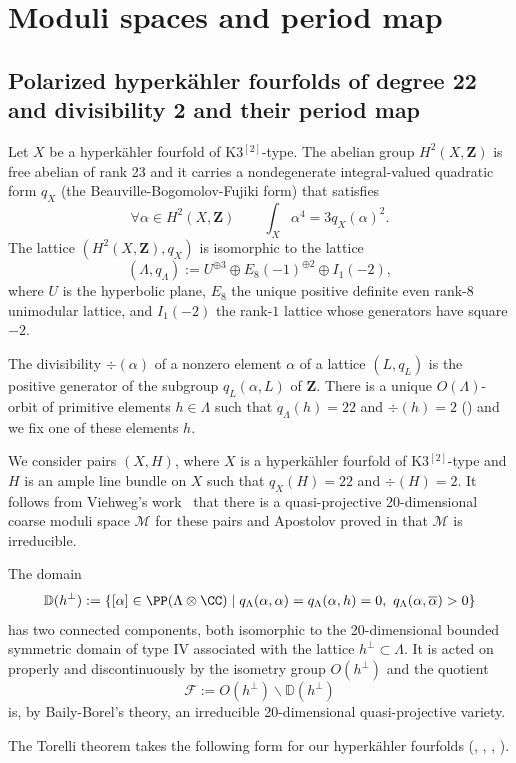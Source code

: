 \documentclass[JEP,XML,SOM,Unicode, NoEqCountersInSection,NoFloatCountersInSection]{cedram}
\let\mathcal\mathscr
\theoremstyle{definition}
\newcommand\Z{{\mathbf Z}}
\newcommand\mD{\mathbb{D}}
\newcommand\cF{\mathcal{F}}
\newcommand\cM{\mathcal{M}}
\newcommand\hk{hyperkähler\xspace}
\begin{document}
\section{Moduli spaces and period map}

\subsection{Polarized \hk fourfolds of degree 22 and divisibility 2 and their period map}\label{sec21}

Let $X$ be a \hk fourfold of K3$^{[2]}$-type. The abelian group $H^2(X,\Z)$ is free abelian of rank 23 and it carries a nondegenerate integral-valued quadratic form $q_X$ (the Beauville-Bogomolov-Fujiki form) that satisfies
\[
\forall \alpha\in H^2(X,\Z)\qquad \int_X\alpha^4=3q_X(\alpha)^2
.
\]
The lattice $(H^2(X,\Z),q_X)$ is isomorphic to the lattice
\[
(\Lambda,q_\Lambda):=U^{\oplus 3}\oplus E_8(-1)^{\oplus 2}\oplus I_1(-2),
\]
where $U$ is the hyperbolic plane, $E_8$ the unique positive definite even rank-$8$ unimodular lattice, and $I_1(-2) $ the rank-$1$ lattice whose generators have square $-2$.

The divisibility $\div(\alpha)$ of a nonzero element $\alpha$ of a lattice $( L,q_L)$ is the positive generator of the subgroup $q_L(\alpha, L)$ of $ \Z$. There is a unique $O(\Lambda)$-orbit of primitive elements $h\in \Lambda$ such that $q_\Lambda(h)=22$ and $\div(h)=2$ (\cite[Cor.\,3.7 \& Ex.\,3.10]{ghscomp}) and we fix one of these elements $h$.

We consider pairs $(X,H)$, where $X$ is a \hk fourfold of K3$^{[2]}$-type and $H$ is an ample line bundle on $X$ such that $q_X(H)=22$ and $\div(H)=2$. It follows from Viehweg's work~\cite{vie} that there is a quasi-projective 20-dimensional coarse moduli space $\cM$ for these pairs and Apostolov proved in \cite{apo} that $\cM$ is irreducible.

The domain
\[
\mD(h^\bot):=\{[\alpha]\in\PP(\Lambda\otimes\CC) \mid q_\Lambda(\alpha, \alpha) =q_\Lambda(\alpha, h) =0,\ q_\Lambda(\alpha,\overline \alpha) >0\}
\]
has two connected components, both isomorphic to the 20-dimensional bounded symmetric domain of type IV associated with the lattice $h^\bot\subset \Lambda$.
It is acted on properly and discontinuously by the {isometry group} $ O(h^\bot)$
and the quotient
\[
\cF:= O(h^\bot)\backslash \mD(h^\bot)
\]
is, by Baily-Borel's theory, an irreducible 20-dimensional quasi-projective variety.

The Torelli theorem takes the following form for our \hk fourfolds (\cite{ver}, \cite[Th.\,3.14]{ghssur}, \cite[Th.\,8.4]{marsur}, \cite[Th.\,1.3]{huybki}).
\end{document}
